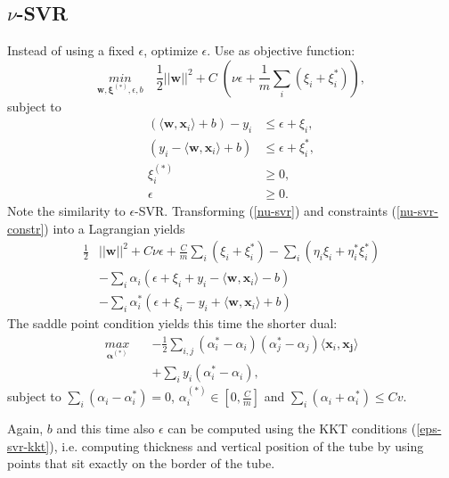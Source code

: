 \documentclass[a4paper,10pt]{article}
\begin{document}
\subsection{$\nu$-SVR}
Instead of using a fixed $\epsilon$, optimize $\epsilon$. Use as objective function:
\begin{equation}
 \label{nu-svr}
 \underset{\mathbf{w}, \mathbf{\xi}^{(*)},\epsilon,b}{min}\quad \frac{1}{2}||\mathbf{w}||^2 + C\;(\nu \epsilon + \frac{1}{m}\sum_i (\xi_i+\xi_i^*)),
\end{equation} 
subject to
\begin{equation}
 \label{nu-svr-constr}
 \begin{split}
  (\langle\mathbf{w},\mathbf{x}_i\rangle+b)-y_i &\le \epsilon + \xi_i,\\
  (y_i-\langle\mathbf{w},\mathbf{x}_i\rangle+b) &\le \epsilon + \xi_i^*,\\
  \xi_i^{(*)} &\ge 0, \\
  \epsilon &\ge 0.
 \end{split}
\end{equation} 
Note the similarity to $\epsilon$-SVR. Transforming (\ref{nu-svr}) and constraints (\ref{nu-svr-constr}) into a Lagrangian yields
\begin{equation}
\begin{split}
 \frac{1}{2} &||\mathbf{w}||^2 + C\nu\epsilon + \frac{C}{m}\sum_i (\xi_i + \xi_i^*) - \sum_i (\eta_i\xi_i + \eta_i^*\xi_i^*)\\
             & -\sum_i \alpha_i(\epsilon + \xi_i + y_i - \langle\mathbf{w},\mathbf{x}_i\rangle - b)\\
             & -\sum_i \alpha_i^*(\epsilon + \xi_i - y_i + \langle\mathbf{w},\mathbf{x}_i\rangle + b)
\end{split}
\end{equation}
The saddle point condition yields this time the shorter dual:
\begin{equation}
 \label{nu-svr-dual}
 \begin{split}
  \underset{\bm{\alpha^{(*)}}}{max}\quad &-\frac{1}{2}\sum_{i,j}(\alpha_i^*-\alpha_i)(\alpha_j^*-\alpha_j)\langle\mathbf{x}_i,\mathbf{x_j}\rangle\\
  \quad &+\sum_{i}y_i(\alpha_i^*-\alpha_i),
 \end{split}
\end{equation} 
subject to $\sum_i(\alpha_i-\alpha_i^*)=0$, $\alpha_i^{(*)} \in [0,\frac{C}{m}]$ and $\sum_i(\alpha_i+\alpha_i^*)\le Cv$.

Again, $b$ and this time also $\epsilon$ can be computed using the KKT conditions (\ref{eps-svr-kkt}), i.e. computing thickness and vertical position of the tube by using points that sit exactly on the border of the tube.
\end{document}
